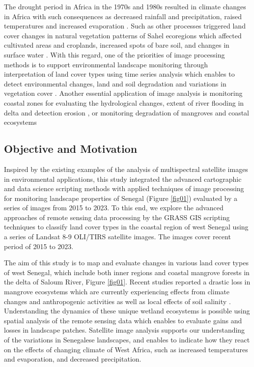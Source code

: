 \documentclass[land,article,submit,pdftex,moreauthors]{Definitions/mdpi}
\begin{document}
The drought period in Africa in the 1970s and 1980s resulted in climate changes in Africa with such consequences as decreased rainfall and precipitation, raised temperatures and increased evaporation \cite{Paturel,Lemenkova202217}. Such as other processes triggered land cover changes in natural vegetation patterns of Sahel ecoregions which affected cultivated areas and croplands, increased spots of bare soil, and changes in surface water \cite{Fritz,Lemenkova202313}. With this regard, one of the priorities of image processing methods is to support environmental landscape monitoring through interpretation of land cover types using time series analysis which enables to detect environmental changes, land and soil degradation and  variations in vegetation cover \cite{MBOW2008210}. Another essential application of image analysis is monitoring coastal zones for evaluating the hydrological changes, extent of river flooding in delta and detection erosion \cite{NDOUR201892,NGOM201634}, or monitoring degradation of mangroves and coastal ecosystems \cite{LOMBARD2023102027,CARNEY2014126}

\subsection{Objective and Motivation}

Inspired by the existing examples of the analysis of multispectral satellite images in environmental applications, this study integrated the advanced cartographic and data science scripting methods with applied techniques of image processing for monitoring landscape properties of Senegal (Figure \ref{fig01}) evaluated by a series of images from 2015 to 2023. To this end, we explore the advanced approaches of remote sensing data processing by the GRASS GIS scripting techniques to classify land cover types in the coastal region of west Senegal using a series of Landsat 8-9 OLI/TIRS satellite images. The images cover recent period of 2015 to 2023. 

The aim of this study is to map and evaluate changes in various land cover types of west Senegal, which include both inner regions and coastal mangrove forests in the delta of Saloum River, Figure \ref{fig01}. Recent studies reported a drastic loss in mangrove ecosystems which are currently experiencing effects from climate changes and anthropogenic activities \cite{ANDRIEU2020117963} as well as local effects of soil salinity \cite{Devaney}. Understanding the dynamics of these unique wetland ecosystems is possible using spatial analysis of the remote sensing data which enables to evaluate  gains and losses in landscape patches. Satellite image analysis supports our understanding of the variations in  Senegalese landscapes, and enables to indicate how they react on the effects of changing climate of West Africa, such as increased temperatures and evaporation, and decreased precipitation. 
\end{document}
